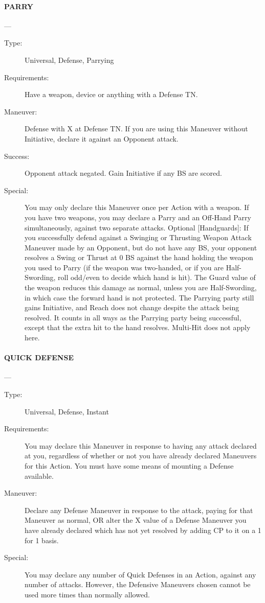 \documentclass[oneside,11pt,english]{book}
\begin{document}
\paragraph{\large\label{man:PARRY} PARRY}---\quad{\large[X]}
\vspace{-10pt}\begin{description} 
\item [Type:] Universal, Defense, Parrying 
\item [Requirements:] Have a weapon, device or anything with a Defense TN. 
\item [Maneuver:] Defense with X at Defense TN. If you are using this Maneuver without Initiative, declare it 
against an Opponent attack. 
\item [Success:] Opponent attack negated. Gain Initiative if any BS are scored. 
\item [Special:] You may only declare this Maneuver once per Action with a weapon. If you have two weapons, 
you may declare a Parry and an Off-Hand Parry simultaneously, against two separate attacks. 
Optional [Handguards]: If you successfully defend against a Swinging or Thrusting Weapon Attack 
Maneuver made by an Opponent, but do not have any BS, your opponent resolves a Swing or Thrust at 0 
BS against the hand holding the weapon you used to Parry (if the weapon was two-handed, or if you are 
Half-Swording, roll odd/even to decide which hand is hit). The Guard value of the weapon reduces this 
damage as normal, unless you are Half-Swording, in which case the forward hand is not protected. The 
Parrying party still gains Initiative, and Reach does not change despite the attack being resolved. It counts 
in all ways as the Parrying party being successful, except that the extra hit to the hand resolves. Multi-Hit 
does not apply here. 
\end{description}

\paragraph{\large\label{man:QUICK DEFENSE} QUICK DEFENSE}---\quad{\large[2]}
\vspace{-10pt}\begin{description} 
\item [Type:] Universal, Defense, Instant 
\item [Requirements:] You may declare this Maneuver in response to having any attack declared at you, 
regardless of whether or not you have already declared Maneuvers for this Action. You must have some 
means of mounting a Defense available. 
\item [Maneuver:] Declare any Defense Maneuver in response to the attack, paying for that Maneuver as 
normal, OR alter the X value of a Defense Maneuver you have already declared which has not yet 
resolved by adding CP to it on a 1 for 1 basis. 
\item [Special:] You may declare any number of Quick Defenses in an Action, against any number of attacks. 
However, the Defensive Maneuvers chosen cannot be used more times than normally allowed. 
\end{description}
\end{document}
